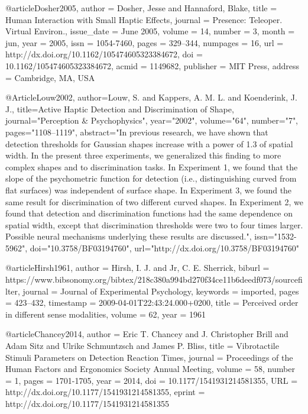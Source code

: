 @article{Dosher2005,
 author = {Dosher, Jesse and Hannaford, Blake},
 title = {{Human Interaction with Small Haptic Effects}},
 journal = {Presence: Teleoper. Virtual Environ.},
 issue_date = {June 2005},
 volume = {14},
 number = {3},
 month = jun,
 year = {2005},
 issn = {1054-7460},
 pages = {329--344},
 numpages = {16},
 url = {http://dx.doi.org/10.1162/105474605323384672},
 doi = {10.1162/105474605323384672},
 acmid = {1149682},
 publisher = {MIT Press},
 address = {Cambridge, MA, USA}
} 

@Article{Louw2002,
author={Louw, S. and Kappers, A. M. L. and Koenderink, J. J.},
title={{Active Haptic Detection and Discrimination of Shape}},
journal="Perception {\&} Psychophysics",
year="2002",
volume="64",
number="7",
pages="1108--1119",
abstract="In previous research, we have shown that detection thresholds for Gaussian shapes increase with a power of 1.3 of spatial width. In the present three experiments, we generalized this finding to more complex shapes and to discrimination tasks. In Experiment 1, we found that the slope of the psychometric function for detection (i.e., distinguishing curved from flat surfaces) was independent of surface shape. In Experiment 3, we found the same result for discrimination of two different curved shapes. In Experiment 2, we found that detection and discrimination functions had the same dependence on spatial width, except that discrimination thresholds were two to four times larger. Possible neural mechanisms underlying these results are discussed.",
issn="1532-5962",
doi="10.3758/BF03194760",
url="http://dx.doi.org/10.3758/BF03194760"
}

@article{Hirsh1961,
  author = {Hirsh, I. J. and Jr, C. E. Sherrick},
  biburl = {https://www.bibsonomy.org/bibtex/218c380a994bd270f34ce11b6deedf073/sourcefilter},
  journal = {Journal of Experimental Psychology},
  keywords = {imported},
  pages = {423--432},
  timestamp = {2009-04-01T22:43:24.000+0200},
  title = {{Perceived order in different sense modalities}},
  volume = {62},
  year = {1961}
}

@article{Chancey2014,
author = {Eric T. Chancey and J. Christopher Brill and Adam Sitz and Ulrike Schmuntzsch and James P. Bliss},
title = {{Vibrotactile Stimuli Parameters on Detection Reaction Times}},
journal = {Proceedings of the Human Factors and Ergonomics Society Annual Meeting},
volume = {58},
number = {1},
pages = {1701-1705},
year = {2014},
doi = {10.1177/1541931214581355},
URL = {http://dx.doi.org/10.1177/1541931214581355},
eprint = {http://dx.doi.org/10.1177/1541931214581355}
}

